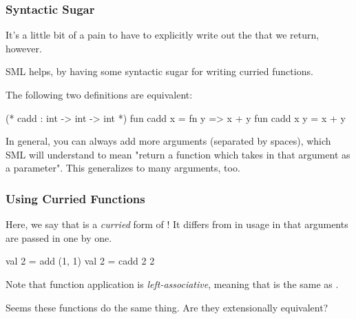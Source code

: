 \documentclass[aspectratio=169, handout]{beamer}
\begin{document}
\begin{frame}[fragile]
  \frametitle{Syntactic Sugar}

  It's a little bit of a pain to have to explicitly write out the 
  that we return, however.

  \pause
  \vspace{\fill}

  SML helps, by having some syntactic sugar for writing curried functions.

  \pause
  \vspace{\fill}

  The following two definitions are equivalent:
  \begin{codeblock}
    (* cadd : int -> int -> int *)
    fun cadd x = fn y => x + y
    fun cadd x y = x + y
  \end{codeblock}

  \pause
  \vspace{\fill}

  In general, you can always add more arguments (separated by spaces), which SML will
  understand to mean "return a function which takes in that argument as a parameter".
  This generalizes to many arguments, too.
\end{frame}

\begin{frame}[fragile]
  \frametitle{Using Curried Functions}

  Here, we say that  is a \textit{curried} form of !
  It differs from  in usage in that arguments are passed in one by one.

  \pause
  \vspace{\fill}

  \begin{codeblock}
    val 2 = add (1, 1)
    val 2 = cadd 2 2
  \end{codeblock}

  \pause
  \vspace{\fill}

  Note that function application is \textit{left-associative}, meaning that
   is the same as .

  \pause
  \vspace{\fill}

  Seems these functions do the same thing. Are they extensionally equivalent?
\end{frame}
\end{document}
